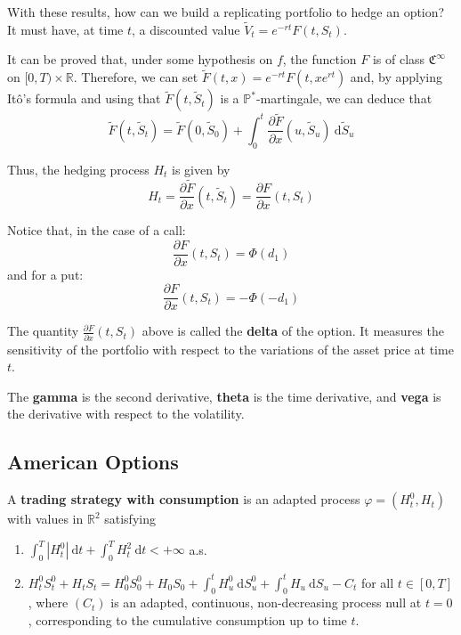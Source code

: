 With these results, how can we build a replicating portfolio to hedge an option? It must have, at time $t$, a discounted value $\tilde{V}_t = e^{-rt}F(t, S_t)$. 

It can be proved that, under some hypothesis on $f$, the function $F$ is of class $\mathfrak{C}^\infty$ on $[0, T) \times \mathbb{R}$. Therefore, we can set $\tilde{F}(t, x) = e^{-rt} F(t, xe^{rt})$ and, by applying Itô's formula and using that $\tilde{F}(t, \tilde{S}_t)$ is a $\mathbb{P}^\ast$-martingale, we can deduce that 
\[  
    \tilde{F}(t, \tilde{S}_t) = \tilde{F}(0, \tilde{S}_0) + \int_0^t \frac{\partial \tilde{F}}{\partial x} (u, \tilde{S}_u) ~\mathrm{d}\tilde{S}_u
\]

Thus, the hedging process $H_t$ is given by 
\[
    H_t = \frac{\partial \tilde{F}}{\partial x} (t, \tilde{S}_t) = \frac{\partial F}{\partial x} (t, S_t)
\]

Notice that, in the case of a call:
\[
    \frac{\partial F}{\partial x} (t, S_t) = \Phi(d_1)
\]
and for a put: 
\[
    \frac{\partial F}{\partial x} (t, S_t) = -\Phi(-d_1)
\]

\begin{definition}['Greeks']
    The quantity $\frac{\partial F}{\partial x} (t, S_t)$ above is called the \textbf{delta} of the option. It measures the sensitivity of the portfolio with respect to the variations of the asset price at time $t$. 

    The \textbf{gamma} is the second derivative, \textbf{theta} is the time derivative, and \textbf{vega} is the derivative with respect to the volatility. 
\end{definition}

\subsection{American Options}

\begin{definition}
    A \textbf{trading strategy with consumption} is an adapted process $\varphi = (H_t^0, H_t)$ with values in $\mathbb{R}^2$ satisfying 
    \begin{enumerate}
        \item $\int_0^T |H_t^0| ~\mathrm{d}t + \int_0^T H_t^2 ~\mathrm{d}t < +\infty$ a.s.
        \item $H_t^0 S_t^0 + H_t S_t = H_0^0 S_0^0 + H_0 S_0 + \int_0^t H_u^0 ~\mathrm{d}S_u^0 + \int_0^t H_u ~\mathrm{d}S_u - C_t$ for all $t \in [0, T]$, where $(C_t)$ is an adapted, continuous, non-decreasing process null at $t = 0$, corresponding to the cumulative consumption up to time $t$.
    \end{enumerate}
\end{definition}

